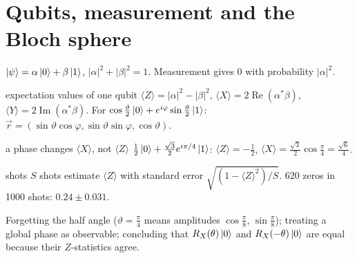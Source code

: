 \documentclass[11pt,a4paper,openany]{book}
\newcounter{wex}[chapter]
\begin{document}
\section{Qubits, measurement and the Bloch sphere}
$\ket\psi = \alpha\ket0 + \beta\ket1$, $|\alpha|^2 + |\beta|^2 = 1$. Measurement gives $0$ with probability $|\alpha|^2$.
\begin{keyres}{expectation values of one qubit}
$\langle Z\rangle = |\alpha|^2 - |\beta|^2$, $\langle X\rangle = 2\operatorname{Re}(\alpha^*\beta)$, $\langle Y\rangle = 2\operatorname{Im}(\alpha^*\beta)$.
For $\cos\frac\vartheta2\ket0 + e^{i\varphi}\sin\frac\vartheta2\ket1$: $\vec r = (\sin\vartheta\cos\varphi, \sin\vartheta\sin\varphi, \cos\vartheta)$.
\end{keyres}
\begin{wexample}{a phase changes $\langle X\rangle$, not $\langle Z\rangle$}
$\frac12\ket0 + \frac{\sqrt3}2e^{i\pi/4}\ket1$: $\langle Z\rangle = -\frac12$, $\langle X\rangle = \frac{\sqrt3}{2}\cos\frac\pi4 = \frac{\sqrt6}4$.
\end{wexample}
\begin{keyres}{shots}
$S$ shots estimate $\langle Z\rangle$ with standard error $\sqrt{(1 - \langle Z\rangle^2)/S}$. 620 zeros in 1000 shots: $0.24 \pm 0.031$.
\end{keyres}
\begin{trap}
Forgetting the half angle ($\vartheta = \frac\pi4$ means amplitudes $\cos\frac\pi8$, $\sin\frac\pi8$); treating a global phase as observable;
concluding that $R_X(\theta)\ket0$ and $R_X(-\theta)\ket0$ are equal because their $Z$-statistics agree.
\end{trap}

\end{document}
